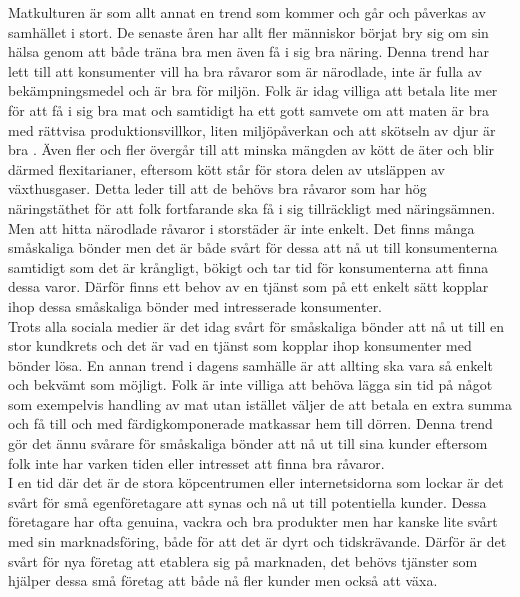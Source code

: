 \documentclass[10pt,a4paper,oneside]{article}
\begin{document}
Matkulturen är som allt annat en trend som kommer och går och påverkas av samhället i stort. De senaste åren har allt fler människor börjat bry sig om sin hälsa genom att både träna bra men även få i sig bra näring. Denna trend har lett till att konsumenter vill ha bra råvaror som är närodlade, inte är fulla av bekämpningsmedel och är bra för miljön. Folk är idag villiga att betala lite mer för att få i sig bra mat och samtidigt ha ett gott samvete om att maten är bra med rättvisa produktionsvillkor, liten miljöpåverkan och att skötseln av djur är bra \cite{Branchinfo}. Även fler och fler övergår till att minska mängden av kött de äter och blir därmed flexitarianer, eftersom kött står för stora delen av utsläppen av växthusgaser. Detta leder till att de behövs bra råvaror som har hög näringstäthet för att folk fortfarande ska få i sig tillräckligt med näringsämnen. Men att hitta närodlade råvaror i storstäder är inte enkelt. Det finns många småskaliga bönder men det är både svårt för dessa att nå ut till konsumenterna samtidigt som det är krångligt, bökigt och tar tid för konsumenterna att finna dessa varor. Därför finns ett behov av en tjänst som på ett enkelt sätt kopplar ihop dessa småskaliga bönder med intresserade konsumenter.\\
 
Trots alla sociala medier är det idag svårt för småskaliga bönder att nå ut till en stor kundkrets och det är vad en tjänst som kopplar ihop konsumenter med bönder lösa. En annan trend i dagens samhälle är att allting ska vara så enkelt och bekvämt som möjligt. Folk är inte villiga att behöva lägga sin tid på något som exempelvis handling av mat utan istället väljer de att betala en extra summa och få till och med färdigkomponerade matkassar hem till dörren. Denna trend gör det ännu svårare för småskaliga bönder att nå ut till sina kunder eftersom folk inte har varken tiden eller intresset att finna bra råvaror.\\

I en tid där det är de stora köpcentrumen eller internetsidorna som lockar är det svårt för små egenföretagare att synas och nå ut till potentiella kunder. Dessa företagare har ofta genuina, vackra och bra produkter men har kanske lite svårt med sin marknadsföring, både för att det är dyrt och tidskrävande. Därför är det svårt för nya företag att etablera sig på marknaden, det behövs tjänster som hjälper dessa små företag att både nå fler kunder men också att växa.\\
 
\end{document}
